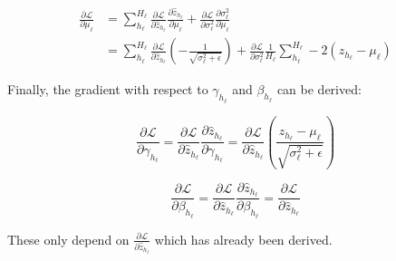 \begin{equation}
\begin{aligned}
\frac{\partial \mathcal{L}}{\partial \mu_\ell} &= \sum_{h_\ell}^{H_\ell} \frac{\partial \mathcal{L}}{\partial \hat{z}_{h_\ell}} \frac{\partial \hat{z}_{h_\ell}}{\partial \mu_\ell} + \frac{\partial \mathcal{L}}{\partial \sigma_{\ell}^2} \frac{\partial \sigma_\ell^2}{\partial \mu_\ell} \\
&= \sum_{h_\ell}^{H_\ell} \frac{\partial \mathcal{L}}{\partial \hat{z}_{h_\ell}} \left(- \frac{1}{\sqrt{\sigma_\ell^2 + \epsilon}}\right) + \frac{\partial \mathcal{L}}{\partial \sigma_{\ell}^2} \frac{1}{H_\ell} \sum_{h_\ell}^{H_\ell} -2 \left(z_{h_\ell} - \mu_\ell\right)
\end{aligned}
\end{equation}

Finally, the gradient with respect to $\gamma_{h_\ell}$ and $\beta_{h_\ell}$ can be derived:

\begin{equation}
\frac{\partial \mathcal{L}}{\partial \gamma_{h_\ell}} = \frac{\partial \mathcal{L}}{\partial \hat{z}_{h_\ell}} \frac{\partial \hat{z}_{h_\ell}}{\partial \gamma_{h_\ell}} = \frac{\partial \mathcal{L}}{\partial \hat{z}_{h_\ell}} \left(\frac{z_{h_\ell} - \mu_\ell}{\sqrt{\sigma_\ell^2 + \epsilon}}\right)
\end{equation}

\begin{equation}
\frac{\partial \mathcal{L}}{\partial \beta_{h_\ell}} = \frac{\partial \mathcal{L}}{\partial \hat{z}_{h_\ell}} \frac{\partial \hat{z}_{h_\ell}}{\partial \beta_{h_\ell}} = \frac{\partial \mathcal{L}}{\partial \hat{z}_{h_\ell}}
\end{equation}

These only depend on $\frac{\partial \mathcal{L}}{\partial \hat{z}_{h_\ell}}$ which has already been derived.